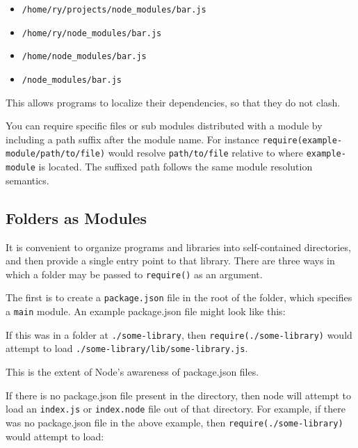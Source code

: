 \begin{itemize}
\itemsep1pt\parskip0pt
\item
  \texttt{/home/ry/projects/node\_modules/bar.js}
\item
  \texttt{/home/ry/node\_modules/bar.js}
\item
  \texttt{/home/node\_modules/bar.js}
\item
  \texttt{/node\_modules/bar.js}
\end{itemize}

This allows programs to localize their dependencies, so that they do not
clash.

You can require specific files or sub modules distributed with a module
by including a path suffix after the module name. For instance
\texttt{require(\textquotesingle{}example-module/path/to/file\textquotesingle{})}
would resolve \texttt{path/to/file} relative to where
\texttt{example-module} is located. The suffixed path follows the same
module resolution semantics.

\subsection{Folders as Modules}\label{folders-as-modules}

It is convenient to organize programs and libraries into self-contained
directories, and then provide a single entry point to that library.
There are three ways in which a folder may be passed to
\texttt{require()} as an argument.

The first is to create a \texttt{package.json} file in the root of the
folder, which specifies a \texttt{main} module. An example package.json
file might look like this:

\begin{Shaded}
\begin{Highlighting}[]
\NormalTok{\{ } \NormalTok{: }\NormalTok{,}
   \NormalTok{: } \NormalTok{\}}
\end{Highlighting}
\end{Shaded}

If this was in a folder at \texttt{./some-library}, then
\texttt{require(\textquotesingle{}./some-library\textquotesingle{})}
would attempt to load \texttt{./some-library/lib/some-library.js}.

This is the extent of Node's awareness of package.json files.

If there is no package.json file present in the directory, then node
will attempt to load an \texttt{index.js} or \texttt{index.node} file
out of that directory. For example, if there was no package.json file in
the above example, then
\texttt{require(\textquotesingle{}./some-library\textquotesingle{})}
would attempt to load:

